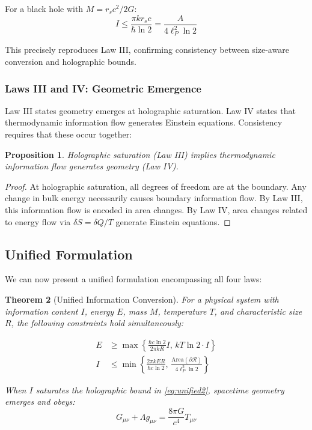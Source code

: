 \documentclass[11pt,a4paper]{article}
\theoremstyle{plain}
\newtheorem{theorem}{Theorem}[section]
\newtheorem{proposition}[theorem]{Proposition}
\theoremstyle{definition}
\theoremstyle{remark}
\begin{document}
For a black hole with $M = r_s c^2/2G$:
\begin{equation}
I \leq \frac{\pi kr_s c}{\hbar\ln 2} = \frac{A}{4\ell_P^2\ln 2}
\end{equation}

This precisely reproduces Law III, confirming consistency between size-aware conversion and holographic bounds.

\subsubsection{Laws III and IV: Geometric Emergence}

Law III states geometry emerges at holographic saturation. Law IV states that thermodynamic information flow generates Einstein equations. Consistency requires that these occur together:

\begin{proposition}
Holographic saturation (Law III) implies thermodynamic information flow generates geometry (Law IV).
\end{proposition}

\begin{proof}
At holographic saturation, all degrees of freedom are at the boundary. Any change in bulk energy necessarily causes boundary information flow. By Law III, this information flow is encoded in area changes. By Law IV, area changes related to energy flow via $\delta S = \delta Q/T$ generate Einstein equations.
\end{proof}

\subsection{Unified Formulation}

We can now present a unified formulation encompassing all four laws:

\begin{theorem}[Unified Information Conversion]
For a physical system with information content $I$, energy $E$, mass $M$, temperature $T$, and characteristic size $R$, the following constraints hold simultaneously:

\begin{align}
E &\geq \max\left\{\frac{\hbar c\ln 2}{2\pi kR}I,\, kT\ln 2\cdot I\right\} \label{eq:unified1}\\
I &\leq \min\left\{\frac{2\pi kER}{\hbar c\ln 2},\, \frac{\text{Area}(\partial\mathcal{R})}{4\ell_P^2\ln 2}\right\} \label{eq:unified2}
\end{align}

When $I$ saturates the holographic bound in \eqref{eq:unified2}, spacetime geometry emerges and obeys:
\begin{equation}
G_{\mu\nu} + \Lambda g_{\mu\nu} = \frac{8\pi G}{c^4}T_{\mu\nu} \label{eq:unified3}
\end{equation}
\end{theorem}
\end{document}
